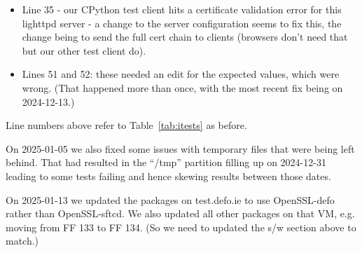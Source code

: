 \begin{itemize}
    \item Line 35 - our CPython test client hits a certificate validation error
        for this lighttpd server - a change to the server configuration seems
        to fix this, the change being to send the full cert chain to clients
        (browsers don't need that but our other test client do).

    \item Lines 51 and 52: these needed an edit for the expected values, which were
        wrong. (That happened more than once, with the most recent fix being
        on 2024-12-13.)

\end{itemize}

Line numbers above refer to Table~\ref{tab:itests} as before.

On 2025-01-05 we also fixed some issues with temporary files that were being
left behind. That had resulted in the ``/tmp'' partition filling up on 2024-12-31
leading to some tests failing and hence skewing results between those dates.

On 2025-01-13 we updated the packages on test.defo.ie to use OpenSSL-defo rather
than OpenSSL-sftcd. We also updated all other packages on that VM, e.g. moving
from FF 133 to FF 134. (So we need to updated the s/w section above to match.)

